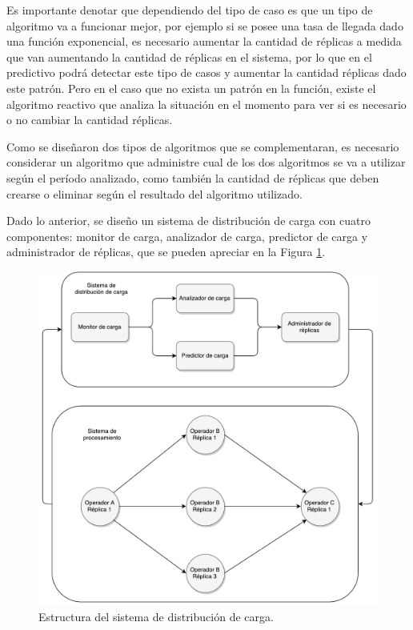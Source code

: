 Es importante denotar que dependiendo del tipo de caso es que un tipo de algoritmo va a funcionar mejor, por ejemplo si se posee una tasa de llegada dado una función exponencial, es necesario aumentar la cantidad de réplicas a medida que van aumentando la cantidad de réplicas en el sistema, por lo que en el predictivo podrá detectar este tipo de casos y aumentar la cantidad réplicas dado este patrón. Pero en el caso que no exista un patrón en la función, existe el algoritmo reactivo que analiza la situación en el momento para ver si es necesario o no cambiar la cantidad réplicas.


Como se diseñaron dos tipos de algoritmos que se complementaran, es necesario considerar un algoritmo que administre cual de los dos algoritmos se va a utilizar según el período analizado, como también la cantidad de réplicas que deben crearse o eliminar según el resultado del algoritmo utilizado.

Dado lo anterior, se diseño un sistema de distribución de carga con cuatro componentes: monitor de carga, analizador de carga, predictor de carga y administrador de réplicas, que se pueden apreciar en la Figura \ref{fig:componentesSistemas}.

\begin{figure}[ht!]
  \centering
    \includegraphics[scale=0.5]{images/Diagrama.pdf}
  \caption{Estructura del sistema de distribución de carga.}
  \label{fig:componentesSistemas}
\end{figure}

